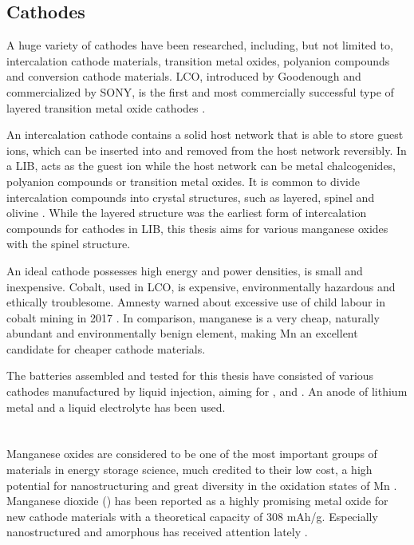 \documentclass[Main/main.tex]{subfiles}
\begin{document}
\subsection{Cathodes}

A huge variety of cathodes have been researched, including, but not limited to, intercalation cathode materials, transition metal oxides, polyanion compounds and conversion cathode materials. LCO, introduced by Goodenough and commercialized by SONY, is the first and most commercially successful type of layered transition metal oxide cathodes \cite{1_rev_liion}.

An intercalation cathode contains a solid host network that is able to store guest ions, which can be inserted into and removed from the host network reversibly. In a LIB,  acts as the guest ion while the host network can be metal chalcogenides, polyanion compounds or transition metal oxides. It is common to divide intercalation compounds into crystal structures, such as layered, spinel and olivine \cite{1_rev_liion}. While the layered structure was the earliest form of intercalation compounds for cathodes in LIB, this thesis aims for various manganese oxides with the spinel structure.

An ideal cathode possesses high energy and power densities, is small and inexpensive. Cobalt, used in LCO, is expensive, environmentally hazardous and ethically troublesome. Amnesty warned about excessive use of child labour in cobalt mining in 2017 \cite{1_amnesty}. In comparison, manganese is a very cheap, naturally abundant and environmentally benign element, making Mn an excellent candidate for cheaper cathode materials.

The batteries assembled and tested for this thesis have consisted of various cathodes manufactured by liquid injection, aiming for ,  and . An anode of lithium metal and a liquid electrolyte has been used.


\paragraph{}~\\[0.8em]
Manganese oxides are considered to be one of the most important groups of materials in energy storage science, much credited to their low cost, a high potential for nanostructuring and great diversity in the oxidation states of Mn \cite{1_Mnox_study}. Manganese dioxide () has been reported as a highly promising metal oxide for new cathode materials with a theoretical capacity of 308 \si{mAh/g}. Especially nanostructured and amorphous  has received attention lately \cite{1_free_MnO2, 1_amorph_MnO2}.
\end{document}
